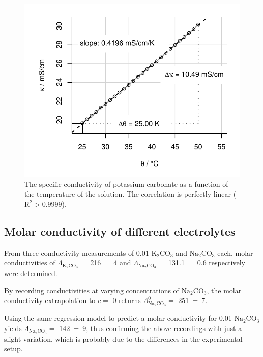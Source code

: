 \begin{figure}[H]
    \centering
    \includegraphics[width=.5\textwidth]{figures/plots/lfk_temperature.pdf}
    \caption{The specific conductivity of potassium carbonate as a function of the temperature of the solution. The correlation is perfectly linear ($\mathrm{R}^2 > 0.9999$).}
    \label{fig:lfk_temp}
\end{figure}



\subsection{Molar conductivity of different electrolytes}

From three conductivity measurements of \qty{0.01}{\M} $\mathrm{K_2CO_3}$ and $\mathrm{Na_2CO_3}$ each, molar conductivities of $\Lambda_{\mathrm{K_2CO_3}} = $ \qty{216 \pm 4}{\Smolar} and $\Lambda_{\mathrm{Na_2CO_3}} = $ \qty{131.1 \pm 0.6}{\Smolar} respectively were determined.

By recording conductivities at varying concentrations of $\mathrm{Na_2CO_3}$, the molar conductivity extrapolation to $c = $ \qty{0}{\M} returns $\Lambda^0_{\mathrm{Na_2CO_3}} = $ \qty{251 \pm 7}{\Smolar}.

Using the same regression model to predict a molar conductivity for \qty{0.01}{\M} $\mathrm{Na_2CO_3}$ yields $\Lambda_{\mathrm{Na_2CO_3}} = $ \qty{142 \pm 9}{\Smolar}, thus confirming the above recordings with just a slight variation, which is probably due to the differences in the experimental setup.

